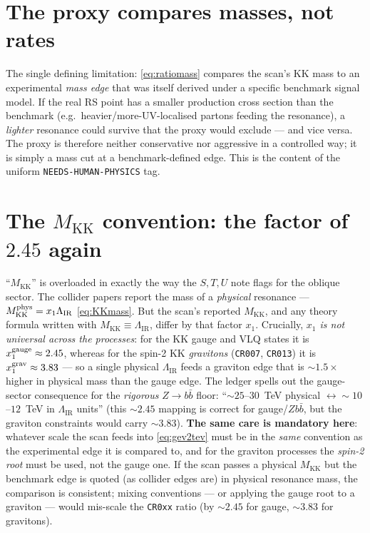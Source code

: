 \documentclass[11pt]{article}
\newcommand{\MKK}{M_{\mathrm{KK}}}
\newcommand{\LIR}{\Lambda_{\mathrm{IR}}}
\newcommand{\code}[1]{\texttt{#1}}
\theoremstyle{definition}
\begin{document}
\section{The proxy compares masses, not rates}
The single defining limitation: \eqref{eq:ratiomass} compares the scan's KK mass
to an experimental \emph{mass edge} that was itself derived under a specific
benchmark signal model. If the real RS point has a smaller production cross
section than the benchmark (e.g.\ heavier/more-UV-localised partons feeding the
resonance), a \emph{lighter} resonance could survive that the proxy would
exclude --- and vice versa. The proxy is therefore neither conservative nor
aggressive in a controlled way; it is simply a mass cut at a benchmark-defined
edge. This is the content of the uniform \code{NEEDS-HUMAN-PHYSICS} tag.

\section{The \texorpdfstring{$\MKK$}{M\_KK} convention: the factor of $2.45$ again}
\label{sec:Mconvention}
``$\MKK$'' is overloaded in exactly the way the $S,T,U$ note flags for the
oblique sector. The collider papers report the mass of a \emph{physical}
resonance --- $\MKK^{\rm phys} = x_1\LIR$ \eqref{eq:KKmass}. But the scan's
reported $\MKK$, and any theory formula written with $\MKK\equiv\LIR$, differ by
that factor $x_1$. Crucially, \emph{$x_1$ is not universal across the
processes}: for the KK gauge and VLQ states it is $x_1^{\rm gauge}\approx 2.45$,
whereas for the spin-2 KK \emph{gravitons} (\code{CR007}, \code{CR013}) it is
$x_1^{\rm grav}\approx 3.83$ --- so a single physical $\LIR$ feeds a graviton
edge that is $\sim 1.5\times$ higher in physical mass than the gauge edge. The
ledger spells out the gauge-sector consequence for the \emph{rigorous} $Z\to
b\bar b$ floor: ``$\sim 25$--$30$~TeV physical $\leftrightarrow \sim 10$--$12$~TeV
in $\LIR$ units'' (this $\sim 2.45$ mapping is correct for gauge/$Zb\bar b$, but
the graviton constraints would carry $\sim 3.83$). \textbf{The same care is
mandatory here}: whatever scale the scan feeds into \eqref{eq:gev2tev} must be in
the \emph{same} convention as the experimental edge it is compared to, and for
the graviton processes the \emph{spin-2 root} must be used, not the gauge one. If
the scan passes a physical $\MKK$ but the benchmark edge is quoted (as collider
edges are) in physical resonance mass, the comparison is consistent; mixing
conventions --- or applying the gauge root to a graviton --- would mis-scale the
\code{CR0xx} ratio (by $\sim 2.45$ for gauge, $\sim 3.83$ for gravitons).
\end{document}
